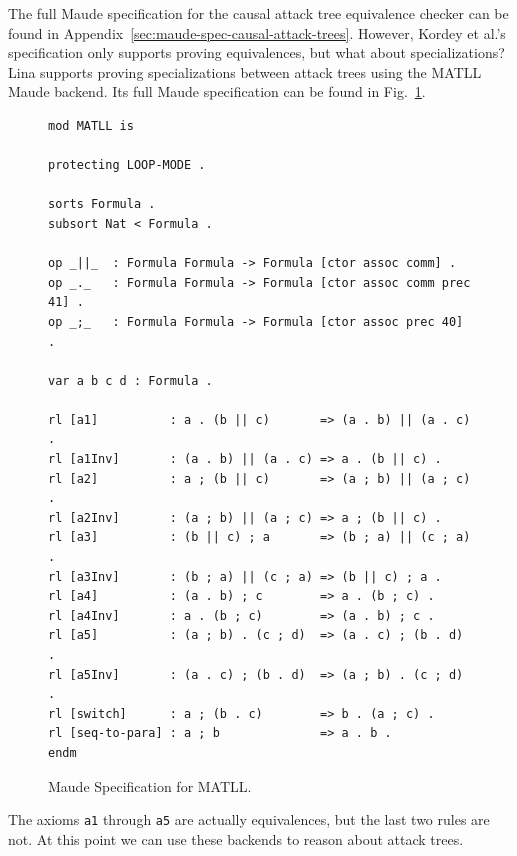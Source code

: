 \documentclass{llncs}
\begin{document}
The full Maude specification for the causal attack tree equivalence
checker can be found in
Appendix~\ref{sec:maude-spec-causal-attack-trees}.  However, Kordey et
al.'s specification only supports proving equivalences, but what about
specializations?  Lina supports proving specializations between attack
trees using the MATLL Maude backend.  Its full Maude specification can
be found in Fig.~\ref{fig:maude-spec-matll}.
\begin{figure}
\begin{mdframed}
\scriptsize
\begin{verbatim}
mod MATLL is

protecting LOOP-MODE .

sorts Formula .
subsort Nat < Formula .

op _||_  : Formula Formula -> Formula [ctor assoc comm] .
op _._   : Formula Formula -> Formula [ctor assoc comm prec 41] .
op _;_   : Formula Formula -> Formula [ctor assoc prec 40] .

var a b c d : Formula .

rl [a1]          : a . (b || c)       => (a . b) || (a . c) .
rl [a1Inv]       : (a . b) || (a . c) => a . (b || c) .
rl [a2]          : a ; (b || c)       => (a ; b) || (a ; c) .
rl [a2Inv]       : (a ; b) || (a ; c) => a ; (b || c) .
rl [a3]          : (b || c) ; a       => (b ; a) || (c ; a) .
rl [a3Inv]       : (b ; a) || (c ; a) => (b || c) ; a .
rl [a4]          : (a . b) ; c        => a . (b ; c) .
rl [a4Inv]       : a . (b ; c)        => (a . b) ; c .
rl [a5]          : (a ; b) . (c ; d)  => (a . c) ; (b . d) .
rl [a5Inv]       : (a . c) ; (b . d)  => (a ; b) . (c ; d) .
rl [switch]      : a ; (b . c)        => b . (a ; c) .
rl [seq-to-para] : a ; b              => a . b .
endm      
\end{verbatim}
\end{mdframed}
  \caption{Maude Specification for MATLL.}
  \label{fig:maude-spec-matll}
\end{figure}
The axioms \verb!a1! through \verb!a5! are actually equivalences, but
the last two rules are not.  At this point we can use these backends
to reason about attack trees.
\end{document}
